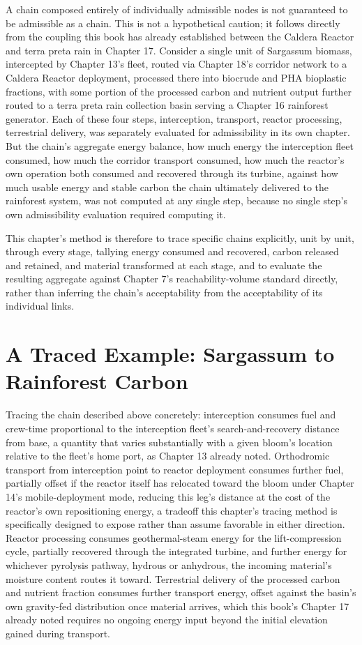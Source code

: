 \documentclass[11pt,oneside]{book}
\begin{document}
A chain composed entirely of individually admissible nodes is not guaranteed to be admissible as a chain. This is not a hypothetical caution; it follows directly from the coupling this book has already established between the Caldera Reactor and terra preta rain in Chapter 17. Consider a single unit of Sargassum biomass, intercepted by Chapter 13's fleet, routed via Chapter 18's corridor network to a Caldera Reactor deployment, processed there into biocrude and PHA bioplastic fractions, with some portion of the processed carbon and nutrient output further routed to a terra preta rain collection basin serving a Chapter 16 rainforest generator. Each of these four steps, interception, transport, reactor processing, terrestrial delivery, was separately evaluated for admissibility in its own chapter. But the chain's aggregate energy balance, how much energy the interception fleet consumed, how much the corridor transport consumed, how much the reactor's own operation both consumed and recovered through its turbine, against how much usable energy and stable carbon the chain ultimately delivered to the rainforest system, was not computed at any single step, because no single step's own admissibility evaluation required computing it.

This chapter's method is therefore to trace specific chains explicitly, unit by unit, through every stage, tallying energy consumed and recovered, carbon released and retained, and material transformed at each stage, and to evaluate the resulting aggregate against Chapter 7's reachability-volume standard directly, rather than inferring the chain's acceptability from the acceptability of its individual links.

\section*{A Traced Example: Sargassum to Rainforest Carbon}

Tracing the chain described above concretely: interception consumes fuel and crew-time proportional to the interception fleet's search-and-recovery distance from base, a quantity that varies substantially with a given bloom's location relative to the fleet's home port, as Chapter 13 already noted. Orthodromic transport from interception point to reactor deployment consumes further fuel, partially offset if the reactor itself has relocated toward the bloom under Chapter 14's mobile-deployment mode, reducing this leg's distance at the cost of the reactor's own repositioning energy, a tradeoff this chapter's tracing method is specifically designed to expose rather than assume favorable in either direction. Reactor processing consumes geothermal-steam energy for the lift-compression cycle, partially recovered through the integrated turbine, and further energy for whichever pyrolysis pathway, hydrous or anhydrous, the incoming material's moisture content routes it toward. Terrestrial delivery of the processed carbon and nutrient fraction consumes further transport energy, offset against the basin's own gravity-fed distribution once material arrives, which this book's Chapter 17 already noted requires no ongoing energy input beyond the initial elevation gained during transport.
\end{document}
